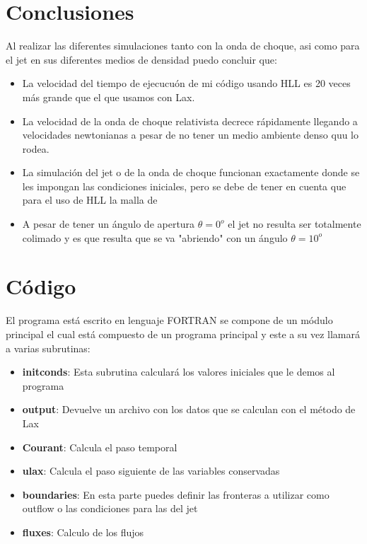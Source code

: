 \documentclass[12pt,a4paper]{book}
\begin{document}
\chapter{Conclusiones}

Al realizar las diferentes simulaciones tanto con la onda de choque, asi como para el jet en sus diferentes medios de densidad puedo concluir que:
\begin{itemize}
\item La velocidad del tiempo de ejecucuón de mi código usando HLL es 20 veces más grande que el que usamos con Lax.
\item La velocidad de la onda de choque relativista decrece rápidamente llegando a velocidades newtonianas a pesar de no tener un medio ambiente denso quu lo rodea.
\item La simulación del jet o de la onda de choque funcionan exactamente donde se les impongan las condiciones iniciales, pero se debe de tener en cuenta que para el uso de HLL la malla de 
\item A pesar de tener un ángulo de apertura $\theta = 0^{o}$ el jet no resulta ser totalmente colimado y es que resulta que se va "abriendo" con un ángulo $\theta = 10^{o}$
\end{itemize}

\appendix
\chapter{Código}\label{aped.A}

El programa está escrito en lenguaje FORTRAN se compone de un módulo principal el cual está compuesto de un programa principal y este a su vez llamará a varias subrutinas:
\begin{itemize}
\item \textbf{initconds}: Esta subrutina calculará los valores iniciales que le demos al programa

\item \textbf{output}: Devuelve un archivo con los datos que se calculan con el método de Lax

\item \textbf{Courant}: Calcula el paso temporal

\item \textbf{ulax}: Calcula el paso siguiente de las variables conservadas

\item \textbf{boundaries}: En esta parte puedes definir las fronteras a utilizar como outflow o las condiciones para las del jet

\item \textbf{fluxes}: Calculo de los flujos
\end{itemize}
\end{document}

